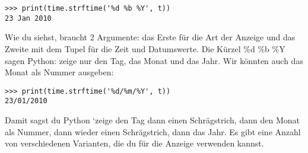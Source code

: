 \begin{Verbatim}[frame=single]
>>> print(time.strftime('%d %b %Y', t))
23 Jan 2010
\end{Verbatim}

Wie du siehst, braucht  2 Argumente: das Erste für die Art der Anzeige und das Zweite mit dem Tupel für die Zeit und Datumswerte. Die Kürzel \%d \%b \%Y  sagen Python: zeige nur den Tag, das Monat und das Jahr. Wir könnten auch das Monat als Nummer ausgeben:

\begin{Verbatim}[frame=single]
>>> print(time.strftime('%d/%m/%Y', t))
23/01/2010
\end{Verbatim}

Damit sagst du Python `zeige den Tag dann einen Schrägstrich, dann den Monat als Nummer, dann wieder einen Schrägstrich, dann das Jahr. Es gibt eine Anzahl von verschiedenen Varianten, die du für die Anzeige verwenden kannst.


